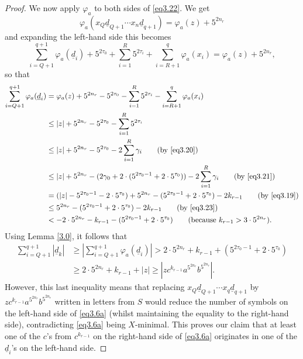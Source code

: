 \documentclass[twoside,11pt]{amsart}
\numberwithin{equation}{section}
\theoremstyle{definition}
\newcommand{\1}{\mathbbm{1}}
\newcommand{\pdt}{\underline}
\begin{document}
\begin{proof}
		We now apply $\varphi_a$ to both sides of \eqref{eq3.22}. We get 
		$$\varphi_a(x_Q \pdt{d}_{Q+1} \cdots x_n \pdt{d}_{q+1}) = \varphi_a(z) + 5^{2n_r}$$
		and expanding the left-hand side this becomes
		$$\sum_{i= Q+1}^{q+1} \varphi_a(\pdt{d}_i) + 5^{2 \tau_0} + \sum_{i=1}^R 5^{2\tau_i} + \sum_{i=R+1}^q \varphi_a(x_i)
		= \varphi_a(z) + 5^{2n_r},$$
		so that 
		\begin{align*} 
			\sum_{i= Q+1}^{q+1} \varphi_a(\pdt{d}_i) &= \varphi_a(z) + 5^{2n_r} -  5^{2 \tau_0} - \sum_{i=1}^R 5^{2\tau_i} - \sum_{i=R+1}^q \varphi_a(x_i) \\
			&\leq |z| + 5^{2n_r} -  5^{2 \tau_0} - \sum_{i=1}^R 5^{2\tau_i} \\
			&\leq |z| + 5^{2n_r} -  5^{2 \tau_0} -  2 \sum_{i=1}^R \gamma_i \qquad (\text{by \eqref{eq3.20}}) \\
			&\leq |z| + 5^{2n_r} - (2 \gamma_0 + 2 \cdot (5^{2\tau_0 -1} + 2 \cdot 5^{\tau_0} )) - 2 \sum_{i=1}^R \gamma_i \qquad (\text{by  \eqref{eq3.21}})\\
			&= (|z| - 5^{2\tau_0 -1} - 2 \cdot 5^{\tau_0}) +5^{2n_r} - (5^{2\tau_0 -1} + 2 \cdot 5^{\tau_0}) - 2k_{r-1} \qquad (\text{by \eqref{eq3.19}}) \\ 
			&\leq 5^{2n_r} - (5^{2\tau_0 -1} + 2 \cdot 5^{\tau_0}) - 2k_{r-1} \qquad (\text{by \eqref{eq3.23}}) \\
			&< -2 \cdot 5^{2n_r} - k_{r-1} - (5^{2\tau_0 -1} + 2 \cdot 5^{\tau_0}) \qquad (\text{because } k_{r-1}> 3\cdot 5^{2n_r}).
		\end{align*}
		Using Lemma \ref{3.0}, it follows that 
		\begin{align*}
			\sum_{i=Q+1}^{q+1} |\pdt{d}_k| &\geq \left| \sum_{i= Q+1}^{q+1} \varphi_a(\pdt{d}_i) \right| 
			> 2 \cdot 5^{2n_r} + k_{r-1} + (5^{2\tau_0 -1} + 2 \cdot 5^{\tau_0}) \\
			&\geq 2 \cdot 5^{2n_r} + k_{r-1} + |z| 
			\geq |z c^{k_{r-1}} a^{5^{2n_r}} b^{5^{2n_r}}|.   	
		\end{align*}
		However, this last inequality means that replacing $x_{Q} \pdt{d}_{Q+1} \cdots x_q \pdt{d}_{q+1}$ by 
		$z c^{k_{r-1}} a^{5^{2n_r}} b^{5^{2n_r}}$ written in letters from $S$ would reduce the number of symbols on the left-hand side of \eqref{eq3.6a} (whilst maintaining the equality to the right-hand side), contradicting \eqref{eq3.6a} being $X$-minimal. This proves our claim that at least one of the $c$'s from $c^{k_{r-1}}$ on the right-hand side of \eqref{eq3.6a} originates in one of the $\pdt{d}_i$'s on the left-hand side.
		

\end{proof}
\end{document}
